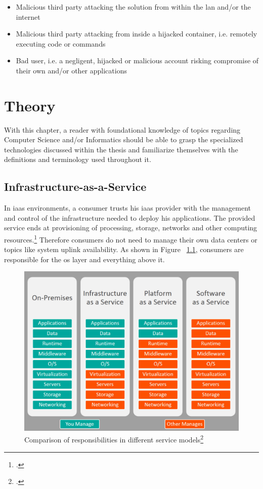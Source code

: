 \begin{itemize}

\item Malicious third party attacking the solution from within the \gls{lan} and/or the internet

\item Malicious third party attacking from inside a hijacked container, i.e. remotely executing code or commands

\item Bad user, i.e. a negligent, hijacked or malicious account risking compromise of their own and/or other applications

\end{itemize}

\chapter{Theory}
With this chapter, a reader with foundational knowledge of topics regarding Computer Science and/or Informatics 
should be able to grasp the specialized technologies discussed within the thesis and familiarize themselves with the definitions and terminology used throughout it.

\section{Infrastructure-as-a-Service}
In \gls{iaas} environments, a consumer trusts his \gls{iaas} provider with the management and control of the infrastructure needed to deploy his applications.
The provided service ends at provisioning of processing, storage, networks and other computing resources.\footcite{nistcloud}
Therefore consumers do not need to manage their own data centers or topics like system uplink availability.
As shown in Figure ~\ref{fig:servicecomparison}, consumers are responsible for the \gls{os} layer and everything above it.

\begin{figure}[H]
\includegraphics[scale=0.4]{pictures/ServiceComparison.jpg} 
\caption{Comparison of responsibilities in different service models\protect\footcite{servicecomparison}}
\label{fig:servicecomparison}
\end{figure}

